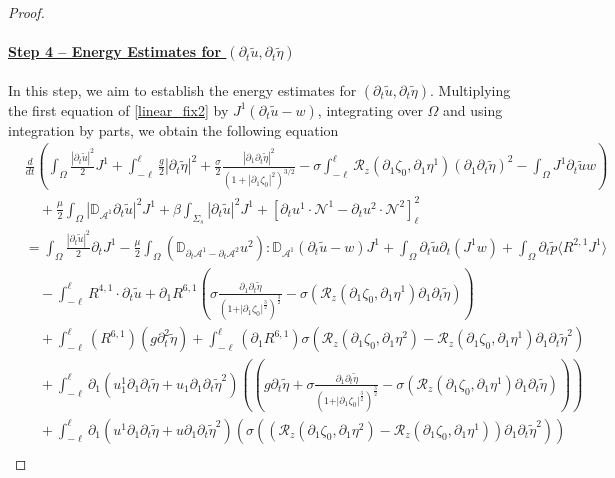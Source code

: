 \documentclass[letterpaper,reqno,10pt,twoside]{amsart}
\theoremstyle{definition}
\theoremstyle{remark}
\def\p{\partial}
\def\Om{\Omega}
\begin{document}
\begin{proof}
			\paragraph{\underline{Step 4 -- Energy Estimates for $(\p_t\tilde{u}, \p_t\tilde{\eta})$}}
			In this step, we aim to establish the energy estimates for $(\p_t\tilde{u}, \p_t\tilde{\eta})$. Multiplying the first equation of \eqref{linear_fix2} by {$J^{1}(\p_{t}\tilde{u}-w)$}, integrating over $\Om$ and using integration by parts, we obtain the following equation
			\begin{equation}\label{energy_fix}
				\begin{aligned}
					&\frac{d}{dt}\left(\int_\Om\frac{|\p_t\tilde{u}|^2}2J^1+\int_{-\ell}^\ell\frac g2|\p_t\tilde{\eta}|^2+\frac\sigma2\frac{|\p_1\p_t\tilde{\eta}|^2}{(1+|\p_1\zeta_0|^2)^{3/2}}-\sigma\int_{-\ell}^{\ell}\mathcal{R}_{z}(\p_{1}\zeta_{0},\p_{1}\eta^{1})(\p_{1}\p_{t}\tilde{\eta})^{2}-\int_{\Omega}J^{1}\p_{t}\tilde{u}w\right)\\  &\quad+\frac\mu2\int_\Om|\mathbb{D}_{\mathcal{A}^1}\p_t\tilde{u}|^2J^1+\beta\int_{\Sigma_s}|\p_t\tilde{u}|^2J^1+[\p_t{u}^{1}\cdot\mathcal{N}^1-\p_{t}u^{2}\cdot \mathcal{N}^{2}]_\ell^2 \\
					&=\int_\Om\frac{|\p_t\tilde{u}|^2}2\p_tJ^1-\frac\mu2\int_\Om\left( \mathbb{D}_{\p_t\mathcal{A}^1-\p_t\mathcal{A}^2}{u}^2\right):\mathbb{D}_{\mathcal{A}^1}(\p_t\tilde{u}-w)J^1+\int_{\Omega}\p_{t}\tilde{u}\p_{t}(J^{1}w)+\int_{\Omega}\p_{t}\tilde{p}\langle R^{2,1}J^{1}\rangle\\
					&\quad-\int_{-\ell}^\ell R^{4,1}\cdot\p_t\tilde{u}+\p_{1}R^{6,1}(\sigma\frac{\p_{1}\p_{t}\tilde{\eta}}{(1+\vert \p_{1}\zeta_{0}\vert^{\frac{3}{2}})^{\frac{3}{2}}}-\sigma(\mathcal{R}_{z}(\p_{1}\zeta_{0},\p_{1}\eta^{1})\p_{1}\p_{t}\tilde{\eta}))\\
					&\quad+\int_{-\ell}^{\ell}(R^{6,1})(g\p_{t}^{2}\tilde{\eta})+\int_{-\ell}^{\ell} (\p_{1}R^{6,1})\sigma (\mathcal{R}_{z}(\p_{1}\zeta_{0},\p_{1}\eta^{2})-\mathcal{R}_{z}(\p_{1}\zeta_{0},\p_{1}\eta^{1})\p_{1}\p_{t}\tilde{\eta}^{2})\\
					&\quad+\int_{-\ell}^{\ell} \p_{1}(u_{1}^{1}\p_{1}\p_{t}\tilde{\eta}+u_{1}\p_{1}\p_{t}\tilde{\eta}^{2})((g\p_{t}\tilde{\eta}+\sigma\frac{\p_{1}\p_{t}\tilde{\eta}}{(1+\vert \p_{1}\zeta_{0}\vert^{\frac{3}{2}})^{\frac{3}{2}}}-\sigma(\mathcal{R}_{z}(\p_{1}\zeta_{0},\p_{1}\eta^{1})\p_{1}\p_{t}\tilde{\eta})))\\
					&\quad+ \int_{-\ell}^{\ell} \p_{1}(u^{1}\p_{1}\p_{t}\tilde{\eta}+u\p_{1}\p_{t}\tilde{\eta}^{2})(\sigma ((\mathcal{R}_{z}(\p_{1}\zeta_{0},\p_{1}\eta^{2})-\mathcal{R}_{z}(\p_{1}\zeta_{0},\p_{1}\eta^{1}))\p_{1}\p_{t}\tilde{\eta}^{2}))\\

\end{aligned}
\end{equation}
\end{proof}
\end{document}
